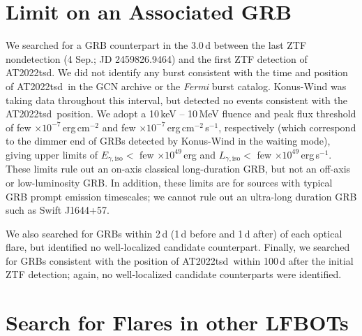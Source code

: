 \documentclass{nature_plusfigure}
\newcommand{\at}{AT2022tsd}
\begin{document}
\begin{methods}


\section{Limit on an Associated GRB}
\label{sec:grbsearch}

We searched for a GRB counterpart in the 3.0\,d between the last ZTF nondetection (4 Sep.; JD 2459826.9464) and the first ZTF detection of \at. We did not identify any burst consistent with the time and position of \at\ in the GCN archive or the {\it Fermi} burst catalog. Konus-Wind was taking data throughout this interval, but detected no events consistent with the \at\ position. 
We adopt a 10\,keV -- 10\,MeV fluence and peak flux threshold of few $\times10^{-7}$\,erg\,cm$^{-2}$ and few $\times10^{-7}$\,erg\,cm$^{-2}$\,s$^{-1}$,
respectively (which correspond to the dimmer end of GRBs detected by Konus-Wind in the waiting mode\cite{Tsvetkova2021}),
giving upper limits of $E_{\gamma,\mathrm{iso}} <$ few $\times 10^{49}$\,erg and $L_{\gamma,\mathrm{iso}} <$ few $\times10^{49}$\,erg\,s$^{-1}$. 
These limits rule out an on-axis classical long-duration GRB, but not an off-axis or low-luminosity GRB\cite{Cano2017}.
In addition, these limits are for sources with typical GRB prompt emission timescales; we cannot rule out an ultra-long duration GRB such as Swift J1644+57.

We also searched for GRBs within 2\,d (1\,d before and 1\,d after) of each optical flare, but identified no well-localized candidate counterpart.
Finally, we searched for GRBs consistent with the position of \at\ within 100\,d after the initial ZTF detection; again, no well-localized candidate counterparts were identified.

\section{Search for Flares in other LFBOTs}
\label{sec:flare-search}


\end{methods}
\end{document}
